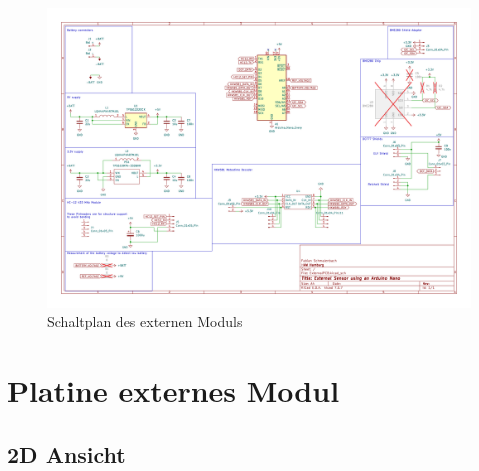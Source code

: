 \documentclass[a4paper,11pt]{article}
\begin{document}
\begin{figure}[H]
  \centering
  \includegraphics[scale=0.7, page=1, angle=90]{../pcbs/ExternalPCB/ExternalPCB.pdf}
  \caption{Schaltplan des externen Moduls}
  \label{pdf:schaltplanExtern}
\end{figure}

\newpage
\section{Platine externes Modul}
\subsection{2D Ansicht}
\end{document}

